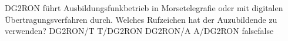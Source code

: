     {DG2RON führt Ausbildungsfunkbetrieb in Morsetelegrafie oder mit digitalen Übertragungsverfahren durch. Welches Rufzeichen hat der Auzubildende zu verwenden?}
    {DG2RON/T}
    {T/DG2RON}
    {DG2RON/A}
    {A/DG2RON}
    {false}{false}